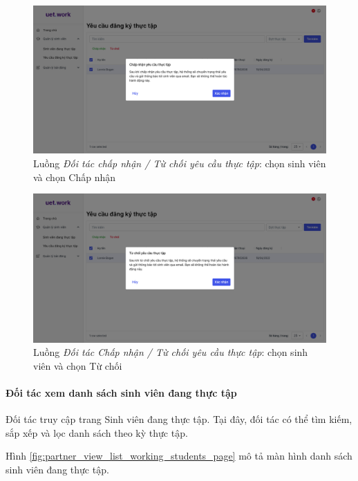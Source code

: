\documentclass[./../main.tex]{subfiles}
\begin{document}
\begin{figure}[]
	\includegraphics[width=\linewidth]{./images/image66.png}
	\caption{Luồng \emph{Đối tác chấp nhận / Từ chối yêu cầu thực tập}: chọn sinh viên và chọn Chấp nhận}
	\label{fig:partner_select_students_approve}
\end{figure}

\begin{figure}[]
	\includegraphics[width=\linewidth]{./images/image67.png}
	\caption{Luồng \emph{Đối tác Chấp nhận / Từ chối yêu cầu thực tập}: chọn sinh viên và chọn Từ chối}
	\label{fig:partner_select_students_reject}
\end{figure}

\paragraph*{Đối tác xem danh sách sinh viên đang thực tập}

Đối tác truy cập trang Sinh viên đang thực tập. Tại đây, đối tác có thể tìm kiếm, sắp xếp và lọc danh sách theo kỳ thực tập.

Hình \ref{fig:partner_view_list_working_students_page} mô tả màn hình danh sách sinh viên đang thực tập.
\end{document}
